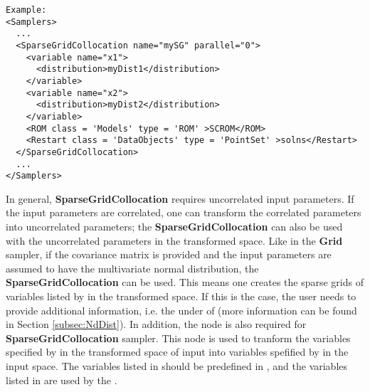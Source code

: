 
\footnotesize
\begin{lstlisting}[style=XML]
Example:
<Samplers>
  ...
  <SparseGridCollocation name="mySG" parallel="0">
    <variable name="x1">
      <distribution>myDist1</distribution>
    </variable>
    <variable name="x2">
      <distribution>myDist2</distribution>
    </variable>
    <ROM class = 'Models' type = 'ROM' >SCROM</ROM>
    <Restart class = 'DataObjects' type = 'PointSet' >solns</Restart>
  </SparseGridCollocation>
  ...
</Samplers>
\end{lstlisting}
 \normalsize

In general, \textbf{SparseGridCollocation} requires uncorrelated input parameters. If the input parameters are correlated, one can transform the 
correlated parameters into uncorrelated parameters; the \textbf{SparseGridCollocation} can also be used with the uncorrelated parameters
in the transformed space. Like in the \textbf{Grid} sampler, if the covariance matrix is provided 
and the input parameters are assumed to have the multivariate normal distribution, the \textbf{SparseGridCollocation} can be used.
This means one creates the sparse grids of variables listed by  in the transformed space. If this is 
the case, the user needs to provide additional information, i.e. the  under  
of  (more information can be found in Section \ref{subsec:NdDist}). In addition, the node 
 is also required for \textbf{SparseGridCollocation} sampler. This node is used to tranform 
the variables specified by  in the transformed space of input into variables spefified by 
 in the input space. The variables listed in  should be predefined 
in , and the variables listed in  
are used by the .



